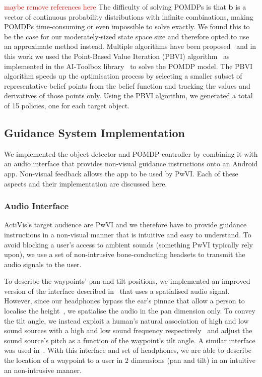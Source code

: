 \documentclass[runningheads]{llncs}
\newcommand\todo[1]{\textcolor{red}{#1}}
\begin{document}
\todo{maybe remove references here}
The difficulty of solving POMDPs is that $\mathbf{b}$ is a vector of continuous probability distributions with infinite combinations, making POMDPs time-consuming or even impossible to solve exactly.
We found this to be the case for our moderately-sized state space size and therefore opted to use an approximate method instead.
Multiple algorithms have been proposed~\cite{bargiacchi2016dynamic,kaelbling1998planning,silver2010monte,spaan2005perseus} and in this work we used the Point-Based Value Iteration (PBVI) algorithm~\cite{pineau2003point} as implemented in the AI-Toolbox library~\cite{aitoolbox} to solve the POMDP model.
The PBVI algorithm speeds up the optimisation process by selecting a smaller subset of representative belief points from the belief function and tracking the values and derivatives of those points only. 
Using the PBVI algorithm, we generated a total of 15 policies, one for each target object. 

\subsection{Guidance System Implementation}

We implemented the object detector and POMDP controller by combining it with an audio interface that provides non-visual guidance instructions onto an Android app.%
Non-visual feedback allows the app to be used by PwVI.
Each of these aspects and their implementation are discussed here.

\subsubsection{Audio Interface}

ActiVis's target audience are PwVI and we therefore have to provide guidance instructions in a non-visual manner that is intuitive and easy to understand. 
To avoid blocking a user's access to ambient sounds (something PwVI typically rely upon), we use a set of non-intrusive bone-conducting headsets to transmit the audio signals to the user. 

To describe the waypoints' pan and tilt positions, we implemented an improved version of the interface described in~\cite{bellotto2013} that uses a spatialised audio signal.
However, since our headphones bypass the ear's pinnae that allow a person to localise the height~\cite{roffler1968factors}, we spatialise the audio in the pan dimension only.
To convey the tilt angle, we instead exploit a human's natural association of high and low sound sources with a high and low sound frequency respectively~\cite{blauert1997spatial} and adjust the sound source's pitch as a function of the waypoint's tilt angle. 
A similar interface was used in~\cite{schauerte2012assistive}.
With this interface and set of headphones, we are able to describe the location of a waypoint to a user in 2 dimensions (pan and tilt) in an intuitive an non-intrusive manner. 
\end{document}
